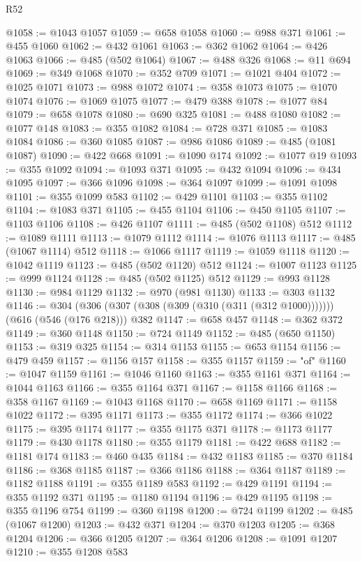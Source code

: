 \begin{lexlean}{R52}
\begin{coremodule}
@1058 := @1043 @1057
@1059 := @658 @1058
@1060 := @988 @371
@1061 := @455 @1060
@1062 := @432 @1061
@1063 := @362 @1062
@1064 := @426 @1063
@1066 := @485 (@502 @1064)
@1067 := @488 @326
@1068 := @11 @694
@1069 := @349 @1068
@1070 := @352 @709
@1071 := @1021 @404
@1072 := @1025 @1071
@1073 := @988 @1072
@1074 := @358 @1073
@1075 := @1070 @1074
@1076 := @1069 @1075
@1077 := @479 @388
@1078 := @1077 @84
@1079 := @658 @1078
@1080 := @690 @325
@1081 := @488 @1080
@1082 := @1077 @148
@1083 := @355 @1082
@1084 := @728 @371
@1085 := @1083 @1084
@1086 := @360 @1085
@1087 := @986 @1086
@1089 := @485 (@1081 @1087)
@1090 := @422 @668
@1091 := @1090 @174
@1092 := @1077 @19
@1093 := @355 @1092
@1094 := @1093 @371
@1095 := @432 @1094
@1096 := @434 @1095
@1097 := @366 @1096
@1098 := @364 @1097
@1099 := @1091 @1098
@1101 := @355 @1099 @583
@1102 := @429 @1101
@1103 := @355 @1102
@1104 := @1083 @371
@1105 := @455 @1104
@1106 := @450 @1105
@1107 := @1103 @1106
@1108 := @426 @1107
@1111 := @485 (@502 @1108) @512
@1112 := @1089 @1111
@1113 := @1079 @1112
@1114 := @1076 @1113
@1117 := @485 (@1067 @1114) @512
@1118 := @1066 @1117
@1119 := @1059 @1118
@1120 := @1042 @1119
@1123 := @485 (@502 @1120) @512
@1124 := @1007 @1123
@1125 := @999 @1124
@1128 := @485 (@502 @1125) @512
@1129 := @993 @1128
@1130 := @984 @1129
@1132 := @970 (@981 @1130)
@1133 := @303 @1132
@1146 := @304 (@306 (@307 (@308 (@309 (@310 (@311 (@312 @1000))))))) (@616 (@546 (@176 @218))) @382
@1147 := @658 @457
@1148 := @362 @372
@1149 := @360 @1148
@1150 := @724 @1149
@1152 := @485 (@650 @1150)
@1153 := @319 @325
@1154 := @314 @1153
@1155 := @653 @1154
@1156 := @479 @459
@1157 := @1156 @157
@1158 := @355 @1157
@1159 := "of"
@1160 := @1047 @1159
@1161 := @1046 @1160
@1163 := @355 @1161 @371
@1164 := @1044 @1163
@1166 := @355 @1164 @371
@1167 := @1158 @1166
@1168 := @358 @1167
@1169 := @1043 @1168
@1170 := @658 @1169
@1171 := @1158 @1022
@1172 := @395 @1171
@1173 := @355 @1172
@1174 := @366 @1022
@1175 := @395 @1174
@1177 := @355 @1175 @371
@1178 := @1173 @1177
@1179 := @430 @1178
@1180 := @355 @1179
@1181 := @422 @688
@1182 := @1181 @174
@1183 := @460 @435
@1184 := @432 @1183
@1185 := @370 @1184
@1186 := @368 @1185
@1187 := @366 @1186
@1188 := @364 @1187
@1189 := @1182 @1188
@1191 := @355 @1189 @583
@1192 := @429 @1191
@1194 := @355 @1192 @371
@1195 := @1180 @1194
@1196 := @429 @1195
@1198 := @355 @1196 @754
@1199 := @360 @1198
@1200 := @724 @1199
@1202 := @485 (@1067 @1200)
@1203 := @432 @371
@1204 := @370 @1203
@1205 := @368 @1204
@1206 := @366 @1205
@1207 := @364 @1206
@1208 := @1091 @1207
@1210 := @355 @1208 @583

\end{coremodule}
\end{lexlean}
